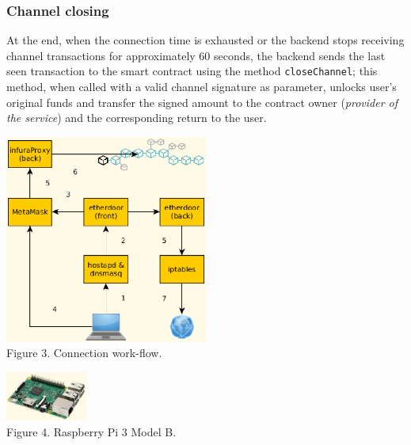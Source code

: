 \documentclass[12pt]{amsart}
\begin{document}
\begin{multicols}{2}
\subsubsection{Channel closing}
At the end, when the connection time is exhausted or the backend
stops receiving channel transactions for approximately 60 seconds,
the backend sends the last seen transaction to the smart contract
using the method \texttt{closeChannel}; this method, when called
with a valid channel signature as parameter, unlocks user's original
funds and transfer the signed amount to the contract owner
(\textit{provider of the service}) and the corresponding return
to the user.

\begin{center}
  \includegraphics[keepaspectratio, width=0.5\textwidth]{images/con-flow-y.eps}
\\
Figure 3. Connection work-flow.
\\
\end{center}

\begin{center}
  \includegraphics[keepaspectratio, width=0.2\textwidth]{images/rpi3modelb-sourceamazon.eps}
\\
Figure 4. Raspberry Pi 3 Model B.
\\
\end{center}


\end{multicols}
\end{document}
